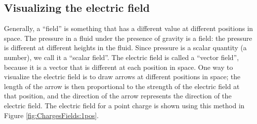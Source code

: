 \subsection{Visualizing the electric field}
Generally, a ``field'' is something that has a different value at different positions in space. The pressure in a fluid under the presence of gravity is a field: the pressure is different at different heights in the fluid. Since pressure is a scalar quantity (a number), we call it a ``scalar field''. The electric field is called a ``vector field'', because it is a vector that is different at each position in space. One way to visualize the electric field is to draw arrows at different positions in space; the length of the arrow is then proportional to the strength of the electric field at that position, and the direction of the arrow represents the direction of the electric field. The electric field for a point charge is shown using this method in Figure \ref{fig:ChargesFields:1pos}.


